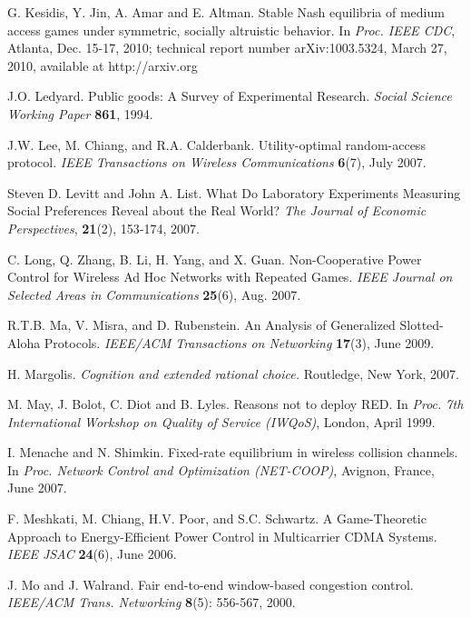 \documentclass[12pt,onecolumn,draftcls]{IEEEtran}
\begin{document}
\begin{thebibliography}{9}
G. Kesidis, Y. Jin, A. Amar and E. Altman.
Stable Nash equilibria of medium access games
under symmetric, socially altruistic behavior.
In {\em Proc. IEEE CDC}, Atlanta, Dec. 15-17, 2010;
technical report number arXiv:1003.5324,
March 27, 2010,
available at http://arxiv.org 




J.O. Ledyard.
Public goods: A Survey of Experimental Research.
{\em Social Science Working Paper} {\bf 861},
1994.

J.W. Lee, M. Chiang, and R.A. Calderbank.
Utility-optimal random-access protocol.
{\em IEEE Transactions on Wireless Communications}
{\bf 6}(7), July 2007.





Steven D. Levitt and John A. List.
What Do Laboratory Experiments Measuring Social Preferences Reveal about the Real World?
{\em The Journal of Economic Perspectives}, 
{\bf 21}(2), 153-174, 2007.

C. Long, Q. Zhang, B. Li, H. Yang, and X. Guan.
Non-Cooperative Power Control for Wireless Ad Hoc Networks with Repeated Games.
{\em IEEE Journal on Selected Areas in Communications}
{\bf 25}(6), Aug. 2007.

R.T.B. Ma, V. Misra, and D. Rubenstein.
An Analysis of Generalized Slotted-Aloha Protocols.
{\em IEEE/ACM Transactions on Networking}
{\bf 17}(3), June 2009.



H. Margolis.
{\em Cognition and extended rational choice.}
Routledge, New York, 2007.

M. May, J. Bolot, C. Diot and B. Lyles.
Reasons not to deploy RED.
In {\em Proc. 7th International Workshop on Quality of
Service (IWQoS)}, London, April 1999.


I. Menache and N. Shimkin. 
Fixed-rate equilibrium in wireless collision channels.
In {\em Proc. Network Control and Optimization (NET-COOP)}, Avignon,
France, June 2007.

F. Meshkati, M. Chiang, H.V. Poor, and S.C. Schwartz.
A Game-Theoretic Approach to Energy-Efficient
Power Control in Multicarrier CDMA Systems.
{\em IEEE JSAC} {\bf 24}(6), June 2006.

J. Mo and J. Walrand.
Fair end-to-end window-based congestion control.
{\em IEEE/ACM Trans. Networking} {\bf 8}(5): 
556-567, 2000.




\end{thebibliography}
\end{document}
